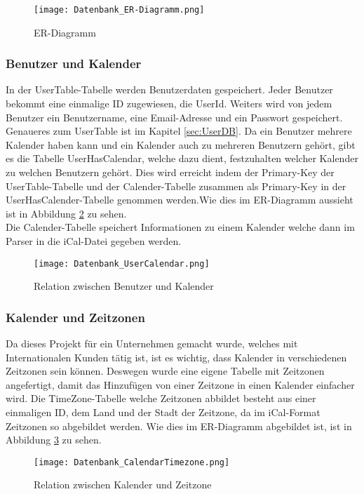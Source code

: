 \begin{figure}[H]
	\texttt{[image: Datenbank\_ER-Diagramm.png]}
    \caption{ER-Diagramm}
    \label{fig:erDiagramm}
\end{figure}

\subsubsection*{Benutzer und Kalender}
\label{ref:benutzerKalender}
In der UserTable-Tabelle werden Benutzerdaten gespeichert. Jeder Benutzer bekommt eine einmalige ID zugewiesen, die UserId. Weiters wird von jedem Benutzer ein Benutzername, eine Email-Adresse und ein Passwort gespeichert. Genaueres zum UserTable ist im Kapitel \ref{sec:UserDB}. Da ein Benutzer mehrere Kalender haben kann und ein Kalender auch zu mehreren Benutzern gehört, gibt es die Tabelle UserHasCalendar, welche dazu dient, festzuhalten welcher Kalender zu welchen Benutzern gehört. Dies wird erreicht indem der Primary-Key der UserTable-Tabelle und der Calender-Tabelle zusammen als Primary-Key in der UserHasCalender-Tabelle genommen werden.Wie dies im ER-Diagramm aussieht ist in Abbildung \ref{fig:userCalender} zu sehen.\\
Die Calender-Tabelle speichert Informationen zu einem Kalender welche dann im Parser in die iCal-Datei gegeben werden.
\begin{figure}[H]
	\texttt{[image: Datenbank\_UserCalendar.png]}
    \caption{Relation zwischen Benutzer und Kalender}
    \label{fig:userCalender}
\end{figure}

\subsubsection*{Kalender und Zeitzonen}
\label{ref:kalenderZeitzonen}
Da dieses Projekt für ein Unternehmen gemacht wurde, welches mit Internationalen Kunden tätig ist, ist es wichtig, dass Kalender in verschiedenen Zeitzonen sein können. Deswegen wurde eine eigene Tabelle mit Zeitzonen angefertigt, damit das Hinzufügen von einer Zeitzone in einen Kalender einfacher wird. Die TimeZone-Tabelle welche Zeitzonen abbildet besteht aus einer einmaligen ID, dem Land und der Stadt der Zeitzone, da im iCal-Format Zeitzonen so abgebildet werden.  Wie dies im ER-Diagramm abgebildet ist, ist in Abbildung \ref{fig:timezoneCalender} zu sehen.
\begin{figure}[H]
	\texttt{[image: Datenbank\_CalendarTimezone.png]}
    \caption{Relation zwischen Kalender und Zeitzone}
    \label{fig:timezoneCalender}
\end{figure}

